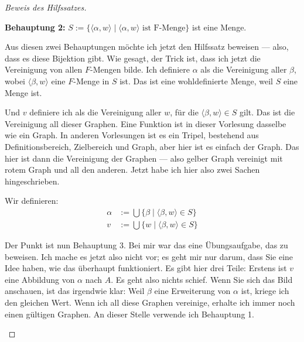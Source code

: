 \begin{proof}[Beweis des Hilfssatzes]
\begin{math-stroke}
\begin{center}
\end{center}

\textbf{Behauptung 2:} $S := \{ \langle \alpha, w \rangle \mid \langle \alpha, w \rangle \text{ ist F-Menge} \}$ ist eine Menge.
\end{math-stroke}

\begin{spoken-clean}[00:49:40 - 00:51:10]
Aus diesen zwei Behauptungen möchte ich jetzt den Hilfssatz beweisen --- also, dass es diese Bijektion gibt. Wie gesagt, der Trick ist, dass ich jetzt die Vereinigung von allen $F$-Mengen bilde. Ich definiere $\alpha$ als die Vereinigung aller $\beta$, wobei $\langle \beta, w \rangle$ eine $F$-Menge in $S$ ist. Das ist eine wohldefinierte Menge, weil $S$ eine Menge ist.

Und $v$ definiere ich als die Vereinigung aller $w$, für die $\langle \beta, w \rangle \in S$ gilt. Das ist die Vereinigung all dieser Graphen. Eine Funktion ist in dieser Vorlesung dasselbe wie ein Graph. In anderen Vorlesungen ist es ein Tripel, bestehend aus Definitionsbereich, Zielbereich und Graph, aber hier ist es einfach der Graph. Das hier ist dann die Vereinigung der Graphen --- also gelber Graph vereinigt mit rotem Graph und all den anderen. Jetzt habe ich hier also zwei Sachen hingeschrieben.
\end{spoken-clean}

\begin{math-stroke}
Wir definieren:
\begin{align*}
\alpha &:= \bigcup \{ \beta \mid \langle \beta, w \rangle \in S \} \\
v &:= \bigcup \{ w \mid \langle \beta, w \rangle \in S \}
\end{align*}
\end{math-stroke}

\begin{spoken-clean}[00:51:10 - 00:52:40]
Der Punkt ist nun Behauptung 3. Bei mir war das eine Übungsaufgabe, das zu beweisen. Ich mache es jetzt also nicht vor; es geht mir nur darum, dass Sie eine Idee haben, wie das überhaupt funktioniert. Es gibt hier drei Teile: Erstens ist $v$ eine Abbildung von $\alpha$ nach $A$. Es geht also nichts schief. Wenn Sie sich das Bild anschauen, ist das irgendwie klar: Weil $\beta$ eine Erweiterung von $\alpha$ ist, kriege ich den gleichen Wert. Wenn ich all diese Graphen vereinige, erhalte ich immer noch einen gültigen Graphen. An dieser Stelle verwende ich Behauptung 1.


\end{spoken-clean}
\end{proof}
